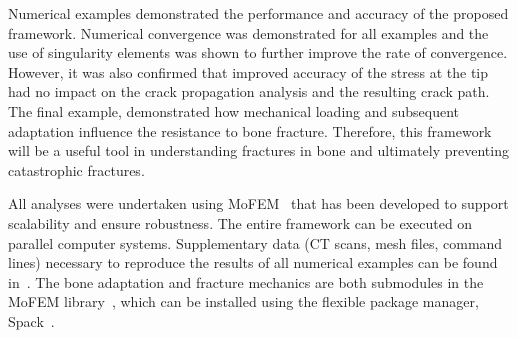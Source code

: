 \documentclass[twocolumn]{svjour3}
\begin{document}

Numerical examples demonstrated the performance and accuracy of the proposed framework. 
Numerical convergence was demonstrated for all examples and the use of singularity elements was shown to further improve the rate of convergence. However, it was also confirmed that improved accuracy of the stress at the tip had no impact on the crack propagation analysis and the resulting crack path.  The final example, demonstrated how mechanical loading and subsequent adaptation influence the resistance to bone fracture. Therefore, this framework will be a useful tool in understanding fractures in bone and ultimately preventing catastrophic fractures. 

All analyses were undertaken using MoFEM~\cite{mofemJoss2020} that has been developed to support scalability and ensure robustness. The entire framework can be executed on parallel computer systems. Supplementary data (CT scans, mesh files, command lines) necessary to reproduce the results of all numerical examples can be found in~\cite{karol_lewandowski_2019_dataset}. The bone adaptation and fracture mechanics are both submodules in the MoFEM library~\cite{mofemJoss2020}, which can be installed using the flexible package manager, Spack~\cite{spack2015}. 


%
%


\end{document}
